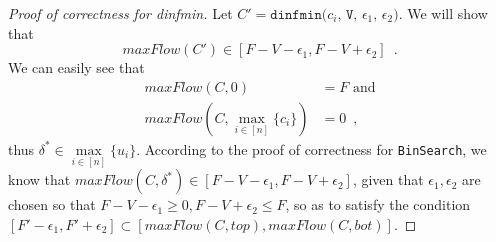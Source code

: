\begin{proof}[Proof of correctness for dinfmin]
  Let $C' = \texttt{dinfmin(}c_i\texttt{, V, } \epsilon_1\texttt{, } \epsilon_2\texttt{)}$. We will show that
  \begin{equation*}
    maxFlow\left(C'\right) \in [F - V - \epsilon_1, F - V + \epsilon_2] \enspace.
  \end{equation*}
  We can easily see that
  \begin{align*}
    maxFlow\left(C, 0\right) &= F \mbox{ and} \\
    maxFlow\left(C, \max\limits_{i \in [n]}\{c_i\}\right) &= 0 \enspace,
  \end{align*}
  thus $\delta^* \in
  \max\limits_{i \in [n]}\{u_i\}$. According to the proof of correctness for \texttt{BinSearch}, we know that
  $maxFlow\left(C, \delta^*\right) \in \left[F - V - \epsilon_1, F - V + \epsilon_2\right]$, given that
  $\epsilon_1, \epsilon_2$ are chosen so that $F - V - \epsilon_1 \geq 0, F - V + \epsilon_2 \leq F$, so as to satisfy
  the condition $\left[F' - \epsilon_1, F' + \epsilon_2\right] \subset \left[maxFlow\left(C, top\right), maxFlow\left(C,
  bot\right)\right]$.
\end{proof}
